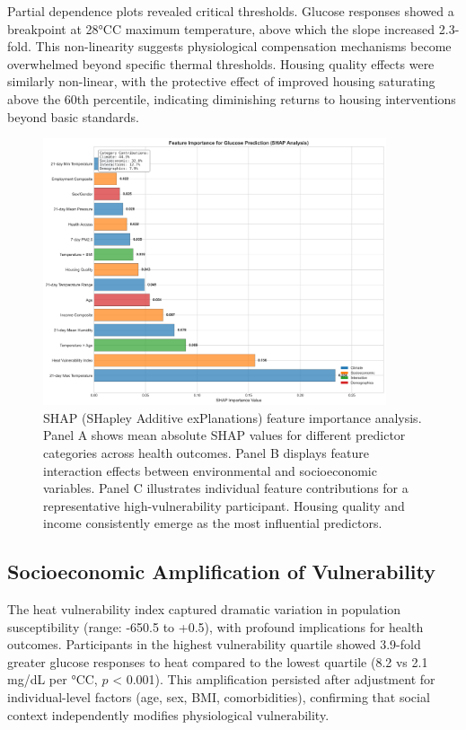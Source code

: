 \documentclass[11pt,a4paper]{article}
\newcommand{\degrees}{°C}
\begin{document}
Partial dependence plots revealed critical thresholds. Glucose responses showed a breakpoint at 28\degrees C maximum temperature, above which the slope increased 2.3-fold. This non-linearity suggests physiological compensation mechanisms become overwhelmed beyond specific thermal thresholds. Housing quality effects were similarly non-linear, with the protective effect of improved housing saturating above the 60th percentile, indicating diminishing returns to housing interventions beyond basic standards.

\begin{figure}[H]
\centering
\includegraphics[width=0.9\textwidth]{heat_analysis_optimized/analysis/Figure3_SHAPImportance_Fixed.png}
\caption{SHAP (SHapley Additive exPlanations) feature importance analysis. Panel A shows mean absolute SHAP values for different predictor categories across health outcomes. Panel B displays feature interaction effects between environmental and socioeconomic variables. Panel C illustrates individual feature contributions for a representative high-vulnerability participant. Housing quality and income consistently emerge as the most influential predictors.}
\label{fig:shap_analysis}
\end{figure}

\subsection{Socioeconomic Amplification of Vulnerability}

The heat vulnerability index captured dramatic variation in population susceptibility (range: -650.5 to +0.5), with profound implications for health outcomes. Participants in the highest vulnerability quartile showed 3.9-fold greater glucose responses to heat compared to the lowest quartile (8.2 vs 2.1 mg/dL per \degrees C, $p$ < 0.001). This amplification persisted after adjustment for individual-level factors (age, sex, BMI, comorbidities), confirming that social context independently modifies physiological vulnerability.
\end{document}
